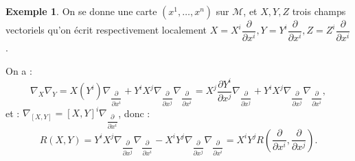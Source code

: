 \documentclass[12pt,a4paper]{article}
\theoremstyle{definition}
\newtheorem{ex}[thm]{Exemple}
\begin{document}
\begin{ex}
On se donne une carte $(x^1,\ldots,x^n)$ sur $\mathcal{M}$, et $X,Y,Z$ trois champs vectoriels qu'on écrit respectivement localement $X=X^i\dfrac{\partial}{\partial x^i}, Y=Y^i\dfrac{\partial}{\partial x^i}, Z=Z^i\dfrac{\partial}{\partial x^i}$.

On a :
$$
\nabla_X\nabla_Y=X(Y^i)\nabla_{\dfrac{\partial}{\partial x^i}}+Y^iX^j\nabla_{\dfrac{\partial}{\partial x^j}}\nabla_{\dfrac{\partial}{\partial x^i}}=X^j\dfrac{\partial Y^i}{\partial x^j}\nabla_{\dfrac{\partial}{\partial x^j}}+Y^iX^j\nabla_{\dfrac{\partial}{\partial x^j}}\nabla_{\dfrac{\partial}{\partial x^i}},
$$
et : $\nabla_{[X,Y]}=[X,Y]^i\nabla_{\dfrac{\partial}{\partial x^i}}$, donc :
$$
R(X,Y)=Y^iX^j\nabla_{\dfrac{\partial}{\partial x^j}}\nabla_{\dfrac{\partial}{\partial x^i}}-X^iY^j\nabla_{\dfrac{\partial}{\partial x^j}}\nabla_{\dfrac{\partial}{\partial x^i}}=X^iY^jR\left(\dfrac{\partial}{\partial x^i},\dfrac{\partial}{\partial x^j}\right).$$


\end{ex}
\end{document}
